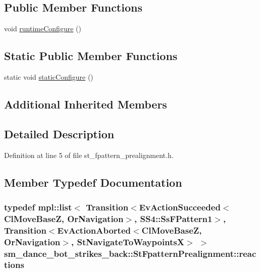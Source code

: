 \subsection*{Public Member Functions}
\begin{DoxyCompactItemize}
\item 
void \hyperlink{structsm__dance__bot__strikes__back_1_1StFpatternPrealignment_a12d2806c617371082410914de7444238}{runtime\+Configure} ()
\end{DoxyCompactItemize}
\subsection*{Static Public Member Functions}
\begin{DoxyCompactItemize}
\item 
static void \hyperlink{structsm__dance__bot__strikes__back_1_1StFpatternPrealignment_a174f61be56796e4124aad1f97a49cb26}{static\+Configure} ()
\end{DoxyCompactItemize}
\subsection*{Additional Inherited Members}


\subsection{Detailed Description}


Definition at line 5 of file st\+\_\+fpattern\+\_\+prealignment.\+h.



\subsection{Member Typedef Documentation}
\subsubsection[{\texorpdfstring{reactions}{reactions}}]{\setlength{\rightskip}{0pt plus 5cm}typedef mpl\+::list$<$ Transition$<$Ev\+Action\+Succeeded$<${\bf Cl\+Move\+BaseZ}, {\bf Or\+Navigation}$>$, {\bf S\+S4\+::\+Ss\+F\+Pattern1}$>$, Transition$<$Ev\+Action\+Aborted$<${\bf Cl\+Move\+BaseZ}, {\bf Or\+Navigation}$>$, {\bf St\+Navigate\+To\+WaypointsX}$>$ $>$ {\bf sm\+\_\+dance\+\_\+bot\+\_\+strikes\+\_\+back\+::\+St\+Fpattern\+Prealignment\+::reactions}}\hypertarget{structsm__dance__bot__strikes__back_1_1StFpatternPrealignment_a2954d92b15e04cee07bd0a5172df7f59}{}\label{structsm__dance__bot__strikes__back_1_1StFpatternPrealignment_a2954d92b15e04cee07bd0a5172df7f59}


